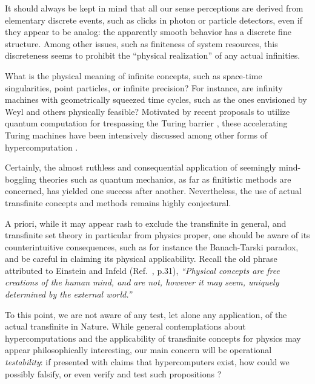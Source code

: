 \documentclass[12pt]{article}
\begin{document}
It should always be kept in mind that all our sense perceptions are derived from elementary discrete events,
such as clicks in photon or particle detectors, even if they appear to be
analog:
the apparently smooth behavior has a discrete  fine structure.
Among other issues, such as finiteness of system resources,
this discreteness seems to prohibit the ``physical realization'' of any actual infinities.

What is the physical meaning of infinite  concepts,
such as space-time singularities, point particles, or infinite precision?
For instance, are infinity machines with geometrically squeezed time cycles,
such as the ones envisioned by Weyl \cite{weyl:49}
and others \cite{gruenbaum:74,thom:54,benna:62,rucker,pit:90,ear-nor:93,hogarth1,hogarth2,beth-59,le-91,sv-aut-rev}
physically feasible?
Motivated by recent proposals to utilize quantum computation for trespassing the Turing barrier
\cite{2002-cal-pav,ad-ca-pa,kieu-02,kieu-02a},
these accelerating Turing machines have been intensively discussed \cite{ord-2006}
among other forms of hypercomputation \cite{Davis-2004,Doria-2006,Davis-2006}.


Certainly, the almost ruthless and consequential application of seemingly
mind-boggling theories
such as quantum mechanics, as  far as finitistic methods are concerned, has
yielded one success after another.
Nevertheless, the use of actual
transfinite concepts and methods remains highly conjectural.


A priori, while it may appear rash to exclude the transfinite in general, and transfinite set theory
in particular from physics proper,
one should be aware of its counterintuitive consequences, such as for instance
the Banach-Tarski paradox, and be careful in claiming its physical
applicability.
Recall the old phrase attributed to Einstein and Infeld
(Ref.~\cite{ein-in}, p.31),
{\em ``Physical concepts are free creations of the human
   mind, and are not, however it may seem,
   uniquely determined by the external world.''}

To this point, we are not aware of any test, let alone any application, of the actual
transfinite in Nature.
While general contemplations about hypercomputations and the applicability of transfinite concepts
for physics may appear philosophically interesting,
our main concern will be operational {\em testability}:
if presented with claims that hypercomputers exist, how could we possibly falsify, or even verify and test such propositions
\cite{Chow-2004}?
\end{document}
